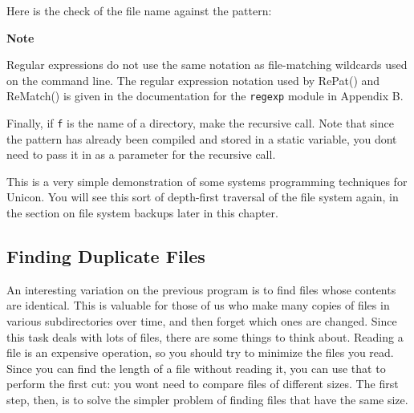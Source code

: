 
Here is the check of the file name against the pattern: 


{\sffamily\bfseries
Note}

{\sffamily
Regular expressions do not use the same notation as file-matching
wildcards used on the command line. The regular expression notation
used by RePat() and ReMatch() is given in the documentation for the
\texttt{regexp} module in Appendix B.}

Finally, if \texttt{f} is the name of a directory, make the recursive
call. Note that since the pattern has already been compiled and stored
in a static variable, you don{\textquotesingle}t need to pass it in as
a parameter for the recursive call.


This is a very simple demonstration of some systems programming
techniques for Unicon. You will see this sort of depth-first traversal
of the file system again, in the section on file system backups later
in this chapter.

\subsection[Finding Duplicate Files]{Finding Duplicate Files}
An interesting variation on the previous program is to find files whose
contents are identical. This is valuable for those of us who make many
copies of files in various subdirectories over time, and then forget
which ones are changed. Since this task deals with lots of files, there
are some things to think about. Reading a file is an expensive
operation, so you should try to minimize the files you read. Since you
can find the length of a file without reading it, you can use that to
perform the first cut: you won{\textquotesingle}t need to compare files
of different sizes. The first step, then, is to solve the simpler
problem of finding files that have the same size. 

